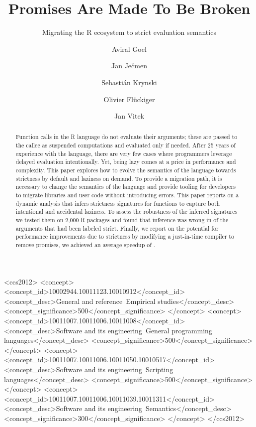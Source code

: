 \documentclass[review,nonacm,screen,acmsmall,anonymous=true]{acmart}
\begin{document}
\title{Promises Are Made To Be Broken}
\subtitle{Migrating the R ecosystem to strict evaluation semantics}

\author{Aviral Goel}
\author{Jan Ječmen}
\author{Sebastián Krynski}
\author{Olivier Flückiger}
\author{Jan Vitek}
\authorsaddresses{}
\renewcommand{\shortauthors}{Goel, et al.}

\begin{abstract}
  Function calls in the R language do not evaluate their arguments; these are
  passed to the callee as suspended computations and evaluated only if needed.
  After 25 years of experience with the language, there are very few cases where
  programmers leverage delayed evaluation intentionally. Yet, being lazy comes
  at a price in performance and complexity. This paper explores how to evolve
  the semantics of the language towards strictness by default and laziness on
  demand. To provide a migration path, it is necessary to change the semantics
  of the language and provide tooling for developers to migrate libraries and
  user code without introducing errors. This paper reports on a dynamic analysis
  that infers strictness signatures for functions to capture both intentional
  and accidental laziness. To assess the robustness of the inferred signatures
  we tested them on 2,000 R packages and found that inference was wrong in
  \robustnesResult of the arguments that had been labeled strict. Finally, we
  report on the potential for performance improvements due to strictness by
  modifying a just-in-time compiler to remove promises, we achieved an average
  speedup of \speedupRshStrict.
\end{abstract}

\begin{CCSXML}
<ccs2012>
<concept>
<concept_id>10002944.10011123.10010912</concept_id>
<concept_desc>General and reference~Empirical studies</concept_desc>
<concept_significance>500</concept_significance>
</concept>
<concept>
<concept_id>10011007.10011006.10011008</concept_id>
<concept_desc>Software and its engineering~General programming languages</concept_desc>
<concept_significance>500</concept_significance>
</concept>
<concept>
<concept_id>10011007.10011006.10011050.10010517</concept_id>
<concept_desc>Software and its engineering~Scripting languages</concept_desc>
<concept_significance>500</concept_significance>
</concept>
<concept>
<concept_id>10011007.10011006.10011039.10011311</concept_id>
<concept_desc>Software and its engineering~Semantics</concept_desc>
<concept_significance>300</concept_significance>
</concept>
</ccs2012>
\end{CCSXML}
\end{document}

